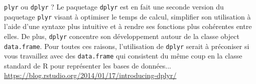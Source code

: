 \begin{moreInfo}{\texttt{plyr} ou \texttt{dplyr} ?}
	Le paquetage \texttt{dplyr} est en fait une seconde version du paquetage \texttt{plyr} visant à optimiser le temps de calcul, simplifier son utilisation à l'aide d'une syntaxe plus intuitive et à rendre ses fonctions plus cohérentes entre elles. De plus, \texttt{dplyr} concentre son développement autour de la classe object \texttt{data.frame}. Pour toutes ces raisons, l'utilisation de \texttt{dplyr} serait à préconiser si vous travaillez avec des \texttt{data.frame} qui consistent du même coup en la classe standard de R pour représenter les bases de données...\\
	\url{https://blog.rstudio.org/2014/01/17/introducing-dplyr/}
\end{moreInfo}